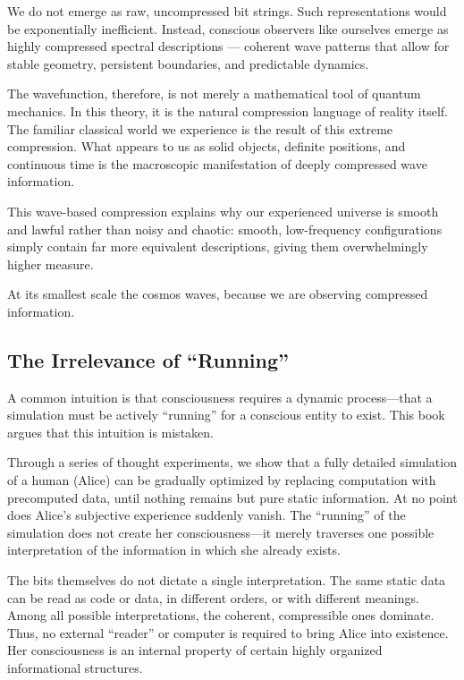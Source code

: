We do not emerge as raw, uncompressed bit strings. Such representations would be exponentially inefficient. Instead, conscious observers like ourselves emerge as highly compressed spectral descriptions --- coherent wave patterns that allow for stable geometry, persistent boundaries, and predictable dynamics.

The wavefunction, therefore, is not merely a mathematical tool of quantum mechanics. In this theory, it is the natural compression language of reality itself. The familiar classical world we experience is the result of this extreme compression. What appears to us as solid objects, definite positions, and continuous time is the macroscopic manifestation of deeply compressed wave information.

This wave-based compression explains why our experienced universe is smooth and lawful rather than noisy and chaotic: smooth, low-frequency configurations simply contain far more equivalent descriptions, giving them overwhelmingly higher measure.

At its smallest scale the cosmos waves, because we are observing compressed information.


\subsection*{The Irrelevance of ``Running''}

A common intuition is that consciousness requires a dynamic process---that a simulation must be actively ``running'' for a conscious entity to exist. This book argues that this intuition is mistaken.

Through a series of thought experiments, we show that a fully detailed simulation of a human (Alice) can be gradually optimized by replacing computation with precomputed data, until nothing remains but pure static information. At no point does Alice's subjective experience suddenly vanish. The ``running'' of the simulation does not create her consciousness---it merely traverses one possible interpretation of the information in which she already exists.

The bits themselves do not dictate a single interpretation. The same static data can be read as code or data, in different orders, or with different meanings. Among all possible interpretations, the coherent, compressible ones dominate. Thus, no external ``reader'' or computer is required to bring Alice into existence. Her consciousness is an internal property of certain highly organized informational structures.



